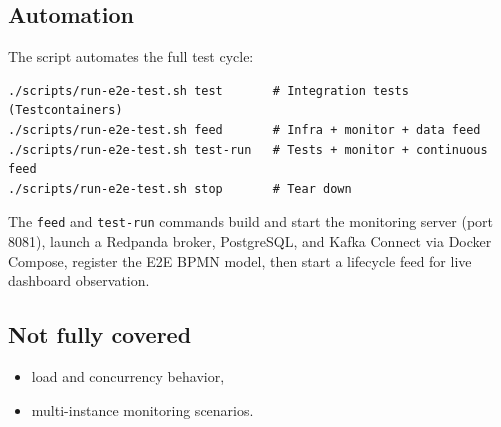 \subsection{Automation}

The script  automates the full test cycle:

\begin{verbatim}
./scripts/run-e2e-test.sh test       # Integration tests (Testcontainers)
./scripts/run-e2e-test.sh feed       # Infra + monitor + data feed
./scripts/run-e2e-test.sh test-run   # Tests + monitor + continuous feed
./scripts/run-e2e-test.sh stop       # Tear down
\end{verbatim}

The \texttt{feed} and \texttt{test-run} commands build and start the
monitoring server (port 8081), launch a Redpanda broker, PostgreSQL, and
Kafka Connect via Docker Compose, register the E2E BPMN model, then start a
lifecycle feed for live dashboard observation.

\subsection{Not fully covered}

\begin{itemize}
\item load and concurrency behavior,
\item multi-instance monitoring scenarios.
\end{itemize}
